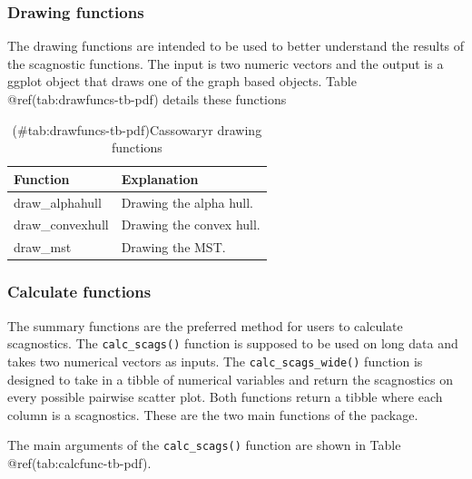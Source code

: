 \hypertarget{drawing-functions}{%
\subsubsection{Drawing functions}\label{drawing-functions}}

The drawing functions are intended to be used to better understand the
results of the scagnostic functions. The input is two numeric vectors
and the output is a ggplot object that draws one of the graph based
objects. Table @ref(tab:drawfuncs-tb-pdf) details these functions

\begin{Schunk}
\begin{table}

\caption{(\#tab:drawfuncs-tb-pdf)Cassowaryr drawing functions}
\centering
\begin{tabular}[t]{>{\raggedright\arraybackslash}p{3cm}l}
\toprule
Function & Explanation\\
\midrule
draw\_alphahull & Drawing the alpha hull.\\
draw\_convexhull & Drawing the convex hull.\\
draw\_mst & Drawing the MST.\\
\bottomrule
\end{tabular}
\end{table}

\end{Schunk}

\hypertarget{calculate-functions}{%
\subsubsection{Calculate functions}\label{calculate-functions}}

The summary functions are the preferred method for users to calculate
scagnostics. The \texttt{calc\_scags()} function is supposed to be used
on long data and takes two numerical vectors as inputs. The
\texttt{calc\_scags\_wide()} function is designed to take in a tibble of
numerical variables and return the scagnostics on every possible
pairwise scatter plot. Both functions return a tibble where each column
is a scagnostics. These are the two main functions of the package.

The main arguments of the \texttt{calc\_scags()} function are shown in
Table @ref(tab:calcfunc-tb-pdf).

